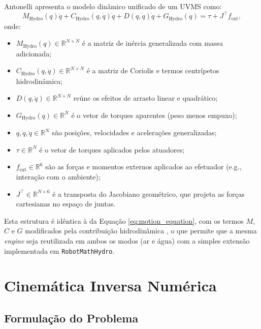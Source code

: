 Antonelli \cite{antonelli2014modelling} apresenta o modelo dinâmico unificado de um UVMS como:
\begin{equation}
    M_{\text{Hydro}}(q)\ddot{q} + C_{\text{Hydro}}(q,\dot{q})\dot{q} + D(q,\dot{q})\dot{q} + G_{\text{Hydro}}(q) = \tau + J^\top f_{\text{ext}},
    \label{eq:uvms_model}
\end{equation}
onde:
\begin{itemize}
    \item $M_{\text{Hydro}}(q) \in \mathbb{R}^{N\times N}$ é a matriz de inércia generalizada com massa adicionada;
    \item $C_{\text{Hydro}}(q,\dot{q}) \in \mathbb{R}^{N\times N}$ é a matriz de Coriolis e termos centrípetos hidrodinâmica;
    \item $D(q,\dot{q}) \in \mathbb{R}^{N\times N}$ reúne os efeitos de arrasto linear e quadrático;
    \item $G_{\text{Hydro}}(q) \in \mathbb{R}^{N}$ é o vetor de torques aparentes (peso menos empuxo);
    \item $q, \dot{q}, \ddot{q} \in \mathbb{R}^{N}$ são posições, velocidades e acelerações generalizadas;
    \item $\tau \in \mathbb{R}^{N}$ é o vetor de torques aplicados pelos atuadores;
    \item $f_{\text{ext}} \in \mathbb{R}^{6}$ são as forças e momentos externos aplicados ao efetuador (e.g., interação com o ambiente);
    \item $J^\top \in \mathbb{R}^{N\times 6}$ é a transposta do Jacobiano geométrico, que projeta as forças cartesianas no espaço de juntas.
\end{itemize}
Esta estrutura é idêntica à da Equação \eqref{eq:motion_equation}, com os termos $M$, $C$ e $G$ modificados pela contribuição hidrodinâmica , o que permite que a mesma \textit{engine} seja reutilizada em ambos os modos (ar e água) com a simples extensão implementada em \texttt{RobotMathHydro}.

\section{Cinemática Inversa Numérica}

\subsection{Formulação do Problema}

